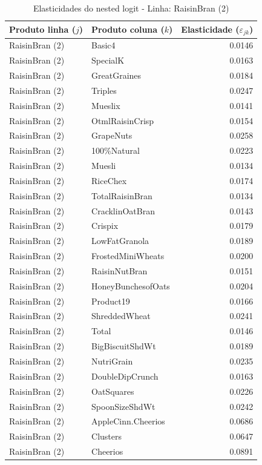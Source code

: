 \begingroup
\begin{table}[H]
\centering
\caption{Elasticidades do nested logit - Linha: RaisinBran (2)}
\label{tab:elas-nested-raisinbran-2}
\small
\begin{tabular}{llr}
\toprule
Produto linha ($j$) & Produto coluna ($k$) & Elasticidade ($\varepsilon_{jk}$) \\
\midrule
RaisinBran (2) & Basic4 & 0.0146 \\
RaisinBran (2) & SpecialK & 0.0163 \\
RaisinBran (2) & GreatGraines & 0.0184 \\
RaisinBran (2) & Triples & 0.0247 \\
RaisinBran (2) & Mueslix & 0.0141 \\
RaisinBran (2) & OtmlRaisinCrisp & 0.0154 \\
RaisinBran (2) & GrapeNuts & 0.0258 \\
RaisinBran (2) & 100\%Natural & 0.0223 \\
RaisinBran (2) & Muesli & 0.0134 \\
RaisinBran (2) & RiceChex & 0.0174 \\
RaisinBran (2) & TotalRaisinBran & 0.0134 \\
RaisinBran (2) & CracklinOatBran & 0.0143 \\
RaisinBran (2) & Crispix & 0.0179 \\
RaisinBran (2) & LowFatGranola & 0.0189 \\
RaisinBran (2) & FrostedMiniWheats & 0.0200 \\
RaisinBran (2) & RaisinNutBran & 0.0151 \\
RaisinBran (2) & HoneyBunchesofOats & 0.0204 \\
RaisinBran (2) & Product19 & 0.0166 \\
RaisinBran (2) & ShreddedWheat & 0.0241 \\
RaisinBran (2) & Total & 0.0146 \\
RaisinBran (2) & BigBiscuitShdWt & 0.0189 \\
RaisinBran (2) & NutriGrain & 0.0235 \\
RaisinBran (2) & DoubleDipCrunch & 0.0163 \\
RaisinBran (2) & OatSquares & 0.0226 \\
RaisinBran (2) & SpoonSizeShdWt & 0.0242 \\
RaisinBran (2) & AppleCinn.Cheerios & 0.0686 \\
RaisinBran (2) & Clusters & 0.0647 \\
RaisinBran (2) & Cheerios & 0.0891 \\

\end{tabular}
\end{table}
